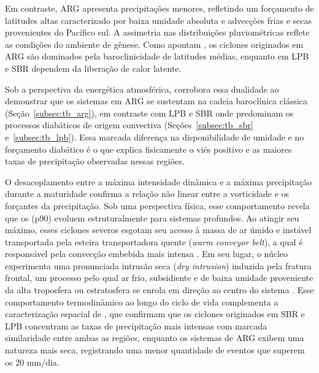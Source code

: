 Em contraste, ARG apresenta precipitações menores, refletindo um forçamento de latitudes altas caracterizado por baixa umidade absoluta e advecções frias e secas provenientes do Pacífico sul.
A assimetria nas distribuições pluviométricas reflete as condições do ambiente de gênese.
Como apontam \citet{gramcianinov2019properties}, os ciclones originados em ARG são dominados pela baroclinicidade de latitudes médias, enquanto em LPB e SBR dependem da liberação de calor latente.

Sob a perspectiva da energética atmosférica, \citet{coutodesouza2024thesis} corrobora essa dualidade ao demonstrar que os sistemas em ARG se sustentam na cadeia baroclínica clássica (Seção~\ref{subsec:tb_arg}), em contraste com LPB e SBR onde predominam os processos diabáticos de origem convectiva (Seções~\ref{subsec:tb_sbr} e~\ref{subsec:tb_lpb}).
Essa marcada diferença na disponibilidade de umidade e no forçamento diabático é o que explica fisicamente o viés positivo e as maiores taxas de precipitação observadas nessas regiões.

O desacoplamento entre a máxima intensidade dinâmica e a máxima precipitação durante a maturidade confirma a relação não linear entre a vorticidade e os forçantes da precipitação.
Sob uma perspectiva física, esse comportamento revela que os (p90) evoluem estruturalmente para sistemas profundos.
Ao atingir seu máximo, esses ciclones severos esgotam seu acesso à massa de ar úmido e instável transportada pela esteira transportadora quente (\textit{warm conveyor belt}), a qual é responsável pela convecção embebida mais intensa \citep{oertel2021warm, blanchard2021warm}.
Em seu lugar, o núcleo experimenta uma pronunciada intrusão seca (\textit{dry intrusion}) induzida pela fratura frontal, um processo pelo qual ar frio, subsidiente e de baixa umidade proveniente da alta troposfera ou estratosfera se enrola em direção ao centro do sistema \citep{shapiro1999bridge}.
Esse comportamento termodinâmico ao longo do ciclo de vida complementa a caracterização espacial de \citet{gramcianinov2019properties}, que confirmam que os ciclones originados em SBR e LPB concentram as taxas de precipitação mais intensas com marcada similaridade entre ambas as regiões, enquanto os sistemas de ARG exibem uma natureza mais seca, registrando uma menor quantidade de eventos que superem os 20 mm/dia.

